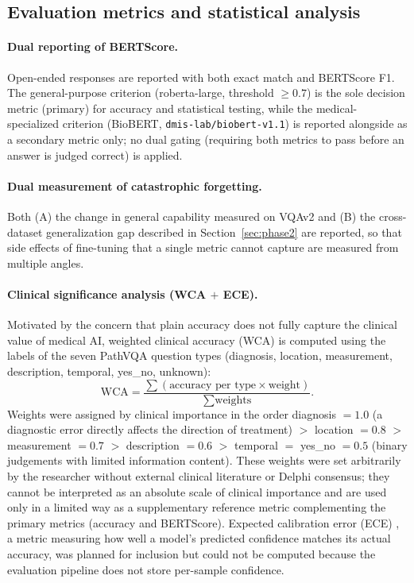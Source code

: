 \subsection{Evaluation metrics and statistical analysis}
\label{sec:stats}

\paragraph{Dual reporting of BERTScore.}
Open-ended responses are reported with both exact match and BERTScore F1. The
general-purpose criterion (roberta-large, threshold $\geq 0.7$) is the sole
decision metric (primary) for accuracy and statistical testing, while the
medical-specialized criterion (BioBERT, \texttt{dmis-lab/biobert-v1.1}) is
reported alongside as a secondary metric only; no dual gating (requiring both
metrics to pass before an answer is judged correct) is applied.

\paragraph{Dual measurement of catastrophic forgetting.}
Both (A) the change in general capability measured on VQAv2 and (B) the
cross-dataset generalization gap described in Section~\ref{sec:phase2} are
reported, so that side effects of fine-tuning that a single metric cannot capture
are measured from multiple angles.

\paragraph{Clinical significance analysis (WCA $+$ ECE).}
Motivated by the concern that plain accuracy does not fully capture the clinical
value of medical AI, weighted clinical accuracy (WCA) is computed using the
labels of the seven PathVQA question types (diagnosis, location, measurement,
description, temporal, yes\_no, unknown):
\[
\mathrm{WCA} = \frac{\sum (\text{accuracy per type} \times \text{weight})}{\sum \text{weights}} .
\]
Weights were assigned by clinical importance in the order diagnosis $=1.0$ (a
diagnostic error directly affects the direction of treatment) $>$ location $=0.8$
$>$ measurement $=0.7$ $>$ description $=0.6$ $>$ temporal $=$ yes\_no $=0.5$
(binary judgements with limited information content). These weights were set
arbitrarily by the researcher without external clinical literature or Delphi
consensus; they cannot be interpreted as an absolute scale of clinical importance
and are used only in a limited way as a supplementary reference metric
complementing the primary metrics (accuracy and BERTScore). Expected calibration
error (ECE) \citep{guo2017calibration}, a metric measuring how well a model's
predicted confidence matches its actual accuracy, was planned for inclusion but
could not be computed because the evaluation pipeline does not store per-sample
confidence.

